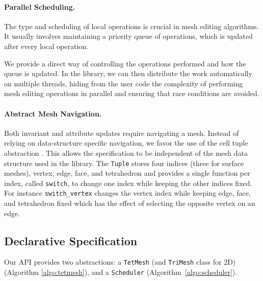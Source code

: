 \paragraph{Parallel Scheduling.}
The type and scheduling of local operations is crucial in mesh editing algorithms. It usually involves maintaining a priority queue of operations, which is updated after every local operation.

We provide a direct way of controlling the operations performed and how the queue is updated. In the library, we can then distribute the work automatically on multiple threads, hiding from the user code the complexity of performing mesh editing operations in parallel and ensuring that race conditions are avoided. 

\paragraph{Abstract Mesh Navigation.}
Both invariant and attribute updates require navigating a mesh. Instead of relying on data-structure specific navigation, we favor the use of the cell tuple abstraction \cite{Brisson1989}. This allows the specification to be independent of the mesh data structure used in the library. The \texttt{Tuple} stores four indices  (three for surface meshes), vertex, edge, face, and tetrahedron and provides a single function per index, called \texttt{switch}, to change one index while keeping the other indices fixed. For instance \texttt{switch\_vertex} changes the vertex index while keeping edge, face, and tetrahedron fixed which has the effect of selecting the opposite vertex on an edge.

\subsection{Declarative Specification}


Our API provides two abstractions: a \texttt{TetMesh} (and \texttt{TriMesh} class for 2D) (Algorithm \ref{algo:tetmesh}), and a \texttt{Scheduler} (Algorithm~\ref{algo:scheduler}).

